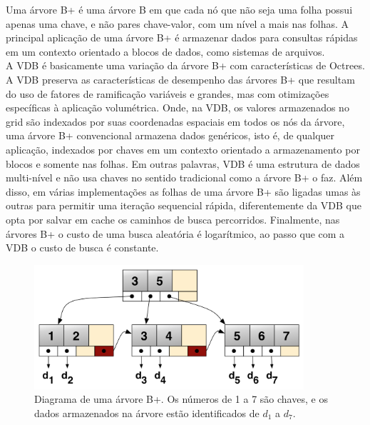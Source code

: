 \documentclass[12pt, a4paper, oneside]{book}
\begin{document}
Uma árvore B+ é uma árvore B em que cada nó que não seja uma folha possui apenas uma chave, e não pares chave-valor, com um nível a mais nas folhas. A principal aplicação de uma árvore B+ é armazenar dados para consultas rápidas em um contexto orientado a blocos de dados, como sistemas de arquivos.\\

A VDB é basicamente uma variação da árvore B+ com características de Octrees. A VDB preserva as características de desempenho das árvores B+ que resultam do uso de fatores de ramificação variáveis e grandes, mas com otimizações específicas à aplicação volumétrica. Onde, na VDB, os valores armazenados no grid são indexados por suas coordenadas espaciais em todos os nós da árvore, uma árvore B+ convencional armazena dados genéricos, isto é, de qualquer aplicação, indexados por chaves em um contexto orientado a armazenamento por blocos e somente nas folhas. Em outras palavras, VDB é uma estrutura de dados multi-nível e não usa chaves no sentido tradicional como a árvore B+ o faz. Além disso, em várias implementações as folhas de uma árvore B+ são ligadas umas às outras para permitir uma iteração sequencial rápida, diferentemente da VDB que opta por salvar em cache os caminhos de busca percorridos. Finalmente, nas árvores B+ o custo de uma busca aleatória é logarítmico, ao passo que com a VDB o custo de busca é constante. 
 
\begin{figure}[!htb]
\center
\includegraphics[width=10cm]{Bplustree}
\caption{Diagrama de uma árvore B+. Os números de 1 a 7 são chaves, e os dados armazenados na árvore estão identificados de $d_{1}$ a $d_{7}$.}
\label{bplustree}
\end{figure}

\end{document}
